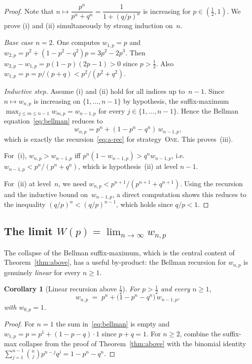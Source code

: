 \documentclass[12pt]{article}
\newtheorem{corollary}[theorem]{Corollary}
\theoremstyle{definition}
\theoremstyle{remark}
\newcommand{\One}{\textsc{One}}
\begin{document}
\begin{proof}
  Note that $n\mapsto \dfrac{p^n}{p^n+q^n} = \dfrac{1}{1+(q/p)^n}$ is increasing for $p \in (\tfrac 12, 1)$. 
  We prove (i) and (ii) simultaneously by strong induction on~$n$.

  \emph{Base case $n=2$.}
  One computes $w_{1,p}=p$ and
  $w_{2,p}=p^2+(1-p^2-q^2)p = 3p^2-2p^3$.  Then
  $w_{2,p}-w_{1,p}=p(1-p)(2p-1)>0$ since $p >\tfrac12$.
  Also $w_{1,p}=p = p/(p + q) < p^2/(p^2+q^2)$.

  \emph{Inductive step.}  Assume (i) and (ii) hold for all indices up
  to~$n-1$.  Since $n\mapsto w_{n,p}$ is increasing on
  $\{1,\dots,n-1\}$ by hypothesis, the suffix-maximum
  $\max_{j\le m\le n-1}w_{m,p}=w_{n-1,p}$ for every
  $j\in\{1,\dots,n-1\}$.  Hence the Bellman
  equation~\eqref{eq:bellman} reduces to
  \[
    w_{n,p} = p^n + (1-p^n-q^n)\,w_{n-1,p},
  \]
  which is exactly the recursion~\eqref{eq:a-rec} for
  strategy~\One.  This proves~(iii).

  For~(i), $w_{n,p}>w_{n-1,p}$ iff
  $p^n(1-w_{n-1,p})>q^n w_{n-1,p}$, i.e.\
  $w_{n-1,p}<p^n/(p^n+q^n)$, which is hypothesis~(ii) at level
  $n-1$.

  For~(ii) at level~$n$, we need $w_{n,p}<p^{n+1}/(p^{n+1}+q^{n+1})$.
  Using the recursion and the inductive bound on~$w_{n-1,p}$, a
  direct computation shows this reduces to the inequality
  $(q/p)^n<(q/p)^{n-1}$, which holds since $q/p<1$.
\end{proof}

\subsection{The limit \texorpdfstring{$W(p)=\lim_{n\to\infty}w_{n,p}$}{W(p) = lim w(n,p)}}\label{sec:above-limit}

The collapse of the Bellman suffix-maximum, which is the central
content of Theorem~\ref{thm:above}, has a useful by-product: the
Bellman recursion for $w_{n,p}$ is genuinely \emph{linear} for
every $n\ge 1$.

\begin{corollary}[Linear recursion above $\tfrac12$]\label{cor:above-lin}
  For $p>\tfrac12$ and every $n\ge 1$,
  \begin{equation}\label{eq:above-lin}
    w_{n,p} \;=\; p^n + \bigl(1-p^n-q^n\bigr)\,w_{n-1,p},
  \end{equation}
  with $w_{0,p}=1$.
\end{corollary}

\begin{proof}
  For $n=1$ the sum in~\eqref{eq:bellman} is empty and
  $w_{1,p}=p=p^1+(1-p-q)\cdot 1$ since $p+q=1$.  For $n\ge 2$,
  combine the suffix-max collapse from the proof of
  Theorem~\ref{thm:above} with the binomial identity
  $\sum_{j=1}^{n-1}\binom{n}{j}p^{n-j}q^j=1-p^n-q^n$.
\end{proof}
\end{document}
